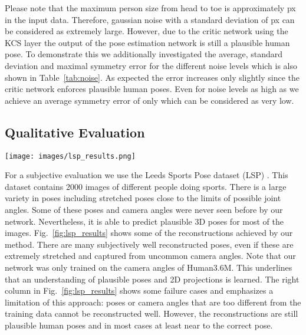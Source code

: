 \documentclass[10pt,twocolumn,letterpaper]{article}
\begin{document}
Please note that the maximum person size from head to toe is approximately px in the input data.
Therefore, gaussian noise with a standard deviation of px can be considered as extremely large.
However, due to the critic network using the KCS layer the output of the pose estimation network is still a plausible human pose.
To demonstrate this we additionally investigated the average, standard deviation and maximal symmetry error for the different noise levels which is also shown in Table~\ref{tab:noise}.
As expected the error increases only slightly since the critic network enforces plausible human poses.
Even for noise levels as high as  we achieve an average symmetry error of only  which can be considered as very low.



\subsection{Qualitative Evaluation}
\begin{figure*}[h!tp]
	\centering
	\texttt{[image: images/lsp\_results.png]}
	\caption{Example 3D pose estimations from the LSP dataset. Good reconstructions are in the left columns. The right column shows some failure cases with very unusual poses or camera angles. Although not perfect the poses are still plausible and close to the correct poses.}
	\label{fig:lsp_results}
	\vspace{-5px}
\end{figure*}
For a subjective evaluation we use the Leeds Sports Pose dataset (LSP) \cite{LeadsSports2010}.
This dataset contains 2000 images of different people doing sports.
There is a large variety in poses including stretched poses close to the limits of possible joint angles.
Some of these poses and camera angles were never seen before by our network.
Nevertheless, it is able to predict plausible 3D poses for most of the images.
Fig.~\ref{fig:lsp_results} shows some of the reconstructions achieved by our method.
There are many subjectively well reconstructed poses, even if these are extremely stretched and captured from uncommon camera angles.
Note that our network was only trained on the camera angles of Human3.6M.
This underlines that an understanding of plausible poses and 2D projections is learned.
The right column in Fig.~\ref{fig:lsp_results} shows some failure cases and emphasizes a limitation of this approach: poses or camera angles that are too different from the training data cannot be reconstructed well.
However, the reconstructions are still plausible human poses and in most cases at least near to the correct pose. 
\end{document}
